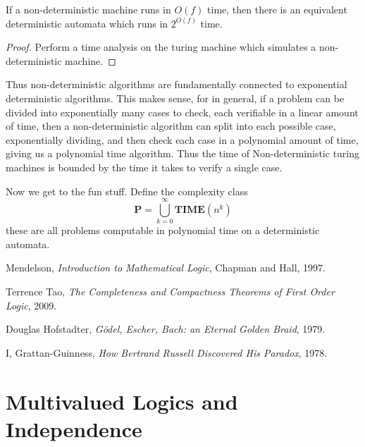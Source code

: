 \begin{theorem}
    If a non-deterministic machine runs in $O(f)$ time, then there is an equivalent deterministic automata which runs in $2^{O(f)}$ time.
\end{theorem}
\begin{proof}
    Perform a time analysis on the turing machine which simulates a non-deterministic machine.
\end{proof}

Thus non-deterministic algorithms are fundamentally connected to exponential deterministic algorithms. This makes sense, for in general, if a problem can be divided into exponentially many cases to check, each verifiable in a linear amount of time, then a non-deterministic algorithm can split into each possible case, exponentially dividing, and then check each case in a polynomial amount of time, giving us a polynomial time algorithm. Thus the time of Non-deterministic turing machines is bounded by the time it takes to verify a single case.

Now we get to the fun stuff. Define the complexity class
%
\[ \textbf{P} = \bigcup_{k = 0}^\infty \textbf{TIME}(n^k) \]
%
these are all problems computable in polynomial time on a deterministic automata.


\begin{thebibliography}{9}

    Mendelson,
    \emph{Introduction to Mathematical Logic},
    Chapman and Hall,
    1997.

    Terrence Tao,
    \emph{The Completeness and Compactness Theorems of First Order Logic},
    2009.

    Douglas Hofstadter,
    \emph{G\"{o}del, Escher, Bach: an Eternal Golden Braid},
    1979.

    I, Grattan-Guinness,
    \emph{How Bertrand Russell Discovered His Paradox},
    1978.

\end{thebibliography}



















\section{Multivalued Logics and Independence}

